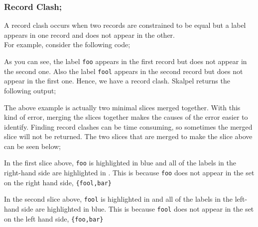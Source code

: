 \documentclass{report}
\begin{document}
\begin{itemize}
\newpage


\subsubsection {Record Clash;}

\subitem A record clash occurs when two records are constrained to be
equal but a label appears in one record and does not appear in the other.
\\
For example, consider the following code;


As you can see, the label \texttt{foo} appears in the first record but does
not appear in the second one. Also the label \texttt{fool} appears in
the second record but does not appear in the first one. Hence, we have
a record clash. Skalpel returns the following output;


The above example is actually two minimal slices merged together. With
this kind of error, merging the slices together makes the causes of
the error easier to identify. Finding record clashes can be time
consuming, so sometimes the merged slice will not be returned. The two
slices that are merged to make the slice above can be seen below;




In the first slice above, \texttt{foo} is highlighted in blue
and all of the labels in the right-hand side are highlighted in
\tesEndPointOne. This is because \texttt{foo} does not
appear in the set on the right hand side, \texttt{\{fool,bar\}}

In the second slice above, \texttt{fool} is highlighted in
\tesEndPointOne and all of the labels in the left-hand side are
highlighted in blue. This is because \texttt{fool} does not appear
in the set on the left hand side, \texttt{\{foo,bar\}}


\end{itemize}
\end{document}
